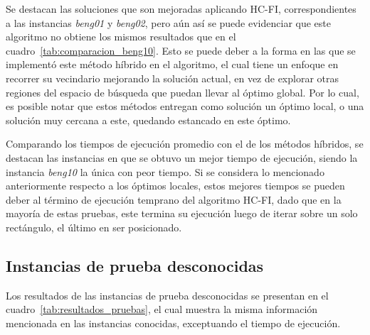 \documentclass[letter, 10pt]{article}
\begin{document}
Se destacan las soluciones que son mejoradas aplicando HC-FI, correspondientes a las instancias \emph{beng01} y \emph{beng02}, pero a\'un as\'i se puede evidenciar que este algoritmo no obtiene los mismos resultados que en el cuadro~\ref{tab:comparacion_beng10}. Esto se puede deber a la forma en las que se implement\'o este m\'etodo h\'ibrido en el algoritmo, el cual tiene un enfoque en recorrer su vecindario mejorando la soluci\'on actual, en vez de explorar otras regiones del espacio de b\'usqueda que puedan llevar al \'optimo global. Por lo cual, es posible notar que estos m\'etodos entregan como soluci\'on un \'optimo local, o una soluci\'on muy cercana a este, quedando estancado en este \'optimo.

Comparando los tiempos de ejecuci\'on promedio con el de los m\'etodos h\'ibridos, se destacan las instancias en que se obtuvo un mejor tiempo de ejecuci\'on, siendo la instancia \textit{beng10} la \'unica con peor tiempo. Si se considera lo mencionado anteriormente respecto a los \'optimos locales, estos mejores tiempos se pueden deber al t\'ermino de ejecuci\'on temprano del algoritmo HC-FI, dado que en la mayor\'ia de estas pruebas, este termina su ejecuci\'on luego de iterar sobre un solo rect\'angulo, el \'ultimo en ser posicionado.

\subsection{Instancias de prueba desconocidas}

Los resultados de las instancias de prueba desconocidas se presentan en el cuadro~\ref{tab:resultados_pruebas}, el cual muestra la misma informaci\'on mencionada en las instancias conocidas, exceptuando el tiempo de ejecuci\'on.
\end{document}
